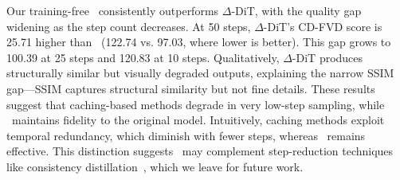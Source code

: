 Our training-free \methodnameshort~consistently outperforms $\Delta$-DiT, with the quality gap widening as the step count decreases. At 50 steps, $\Delta$-DiT's CD-FVD score is 25.71 higher than \methodnameshort~(122.74 vs. 97.03, where lower is better). This gap grows to 100.39 at 25 steps and 120.83 at 10 steps. 
Qualitatively, $\Delta$-DiT produces structurally similar but visually degraded outputs, explaining the narrow SSIM gap—SSIM captures structural similarity but not fine details. 
These results suggest that caching-based methods degrade in very low-step sampling, while \methodnameshort~maintains fidelity to the original model.  Intuitively, caching methods exploit temporal redundancy, which diminish with fewer steps, whereas \methodnameshort~remains effective. 
 This distinction suggests \methodnameshort~may complement step-reduction techniques like consistency distillation~\citep{song2023consistency}, which we leave for future work.



